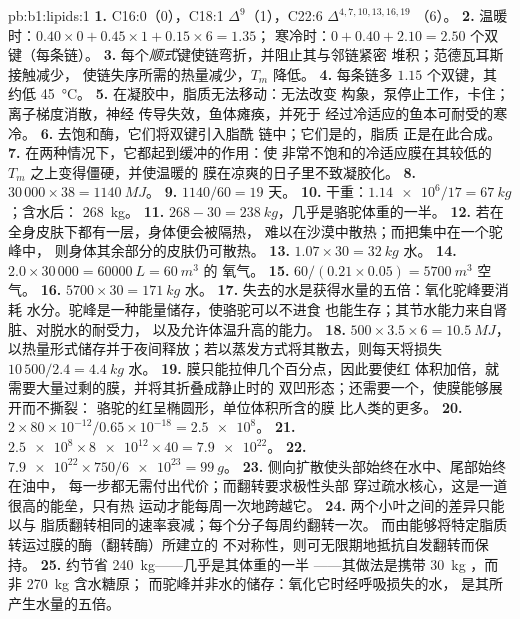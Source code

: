 \begin{solution}{pb:b1:lipids:1}
\textbf{1.} C16:0（0），C18:1 $\Delta^9$（1），C22:6 $\Delta^{4,7,10,13,16,19}$
（6）。
\textbf{2.} 温暖时：$0.40\times 0 + 0.45\times 1 + 0.15\times 6 = 1.35$；
寒冷时：$0 + 0.40 + 2.10 = 2.50$ 个双键（每条链）。
\textbf{3.} 每个\emph{顺式}键使链弯折，并阻止其与邻链紧密
堆积；范德瓦耳斯接触减少，
使链失序所需的热量减少，$T_m$ 降低。
\textbf{4.} 每条链多 $1.15$ 个双键，其
约低 \qty{45}{\celsius}。
\textbf{5.} 在凝胶中，脂质无法移动：无法改变
构象，泵停止工作，卡住；离子梯度消散，神经
传导失效，鱼体瘫痪，并死于
经过冷适应的鱼本可耐受的寒冷。
\textbf{6.} 去饱和酶，它们将双键引入脂酰
链中；它们是的，脂质
正是在此合成。
\textbf{7.} 在两种情况下，它都起到缓冲的作用：使
非常不饱和的冷适应膜在其较低的 $T_m$ 之上变得僵硬，并使温暖的
膜在凉爽的日子里不致凝胶化。
\textbf{8.} $30\,000\times 38 = \qty{1140}{MJ}$。
\textbf{9.} $1140/60 = 19$ 天。
\textbf{10.} 干重：$\num{1.14e6}/17 = \qty{67}{kg}$；含水后：
\qty{268}{kg}。
\textbf{11.} $268 - 30 = \qty{238}{kg}$，几乎是骆驼体重的一半。
\textbf{12.} 若在全身皮肤下都有一层，身体便会被隔热，
难以在沙漠中散热；而把集中在一个驼峰中，
则身体其余部分的皮肤仍可散热。
\textbf{13.} $1.07\times 30 = \qty{32}{kg}$ 水。
\textbf{14.} $2.0\times 30\,000 = \qty{60000}{L} = \qty{60}{m^3}$ 的
氧气。
\textbf{15.} $60/(0.21\times 0.05) = \qty{5700}{m^3}$ 空气。
\textbf{16.} $5700\times 30 = \qty{171}{kg}$ 水。
\textbf{17.} 失去的水是获得水量的五倍：氧化驼峰要消耗
水分。驼峰是一种能量储存，使骆驼可以不进食
也能生存；其节水能力来自肾脏、对脱水的耐受力，
以及允许体温升高的能力。
\textbf{18.} $500\times 3.5\times 6 = \qty{10.5}{MJ}$，以热量形式储存并于夜间释放；若以蒸发方式将其散去，则每天将损失 $10\,500/2.4 = \qty{4.4}{kg}$ 水。
\textbf{19.} 膜只能拉伸几个百分点，因此要使红
体积加倍，就需要大量过剩的膜，并将其折叠成静止时的
双凹形态；还需要一个，使膜能够展开而不撕裂：
骆驼的红呈椭圆形，单位体积所含的膜
比人类的更多。
\textbf{20.} $2\times 80\times 10^{-12}/0.65\times 10^{-18} = \num{2.5e8}$。
\textbf{21.} $\num{2.5e8}\times\num{8e12}\times 40 = \num{7.9e22}$。
\textbf{22.} $\num{7.9e22}\times 750/\num{6e23} = \qty{99}{g}$。
\textbf{23.} 侧向扩散使头部始终在水中、尾部始终在油中，
每一步都无需付出代价；而翻转要求极性头部
穿过疏水核心，这是一道很高的能垒，只有热
运动才能每周一次地跨越它。
\textbf{24.} 两个小叶之间的差异只能以与
脂质翻转相同的速率衰减；每个分子每周约翻转一次。
而由能够将特定脂质转运过膜的酶（翻转酶）所建立的
不对称性，则可无限期地抵抗自发翻转而保持。
\textbf{25.} 约节省 \qty{240}{kg}——几乎是其体重的一半
——其做法是携带 \qty{30}{kg} ，而非 \qty{270}{kg} 含水糖原；
而驼峰并非水的储存：氧化它时经呼吸损失的水，
是其所产生水量的五倍。
\end{solution}
